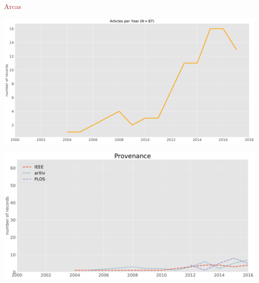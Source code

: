 \documentclass{beamer}
\begin{document}
\begin{frame}
\centering
\textcolor{brown}{\large{Arcas}}
\begin{center}
\begin{figure}
    
\end{figure}
\end{center}
\end{frame}

\begin{frame}
\begin{center}
    \includegraphics[width=\textwidth]{static/timeline.pdf}
\end{center}
\end{frame}

\begin{frame}
\begin{center}
    \includegraphics[width=\textwidth]{static/provenance.pdf}
\end{center}
\end{frame}
\end{document}
